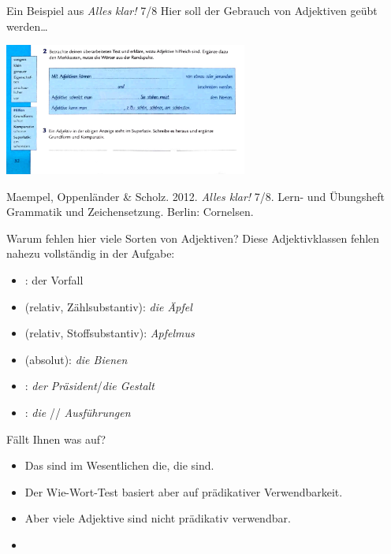 \begin{frame}
  {Ein Beispiel aus \textit{Alles klar!} 7\slash 8}
  Hier soll der Gebrauch von \alert{Adjektiven} geübt werden\ldots
  \begin{center}
    \includegraphics[width=0.6\textwidth]{graphics/adjektive2}
  \end{center}
  \tiny Maempel, Oppenländer \& Scholz. 2012. \textit{Alles klar!} 7\slash 8. Lern- und Übungsheft Grammatik und Zeichensetzung. Berlin: Cornelsen.
\end{frame}


\begin{frame}
  {Warum fehlen hier viele Sorten von Adjektiven?}
  \pause
  Diese Adjektivklassen fehlen nahezu vollständig in der Aufgabe:
  \pause
  \begin{itemize}[<+->]
    \item {}: der  Vorfall
    \item {} (relativ, Zählsubstantiv): \textit{die  Äpfel}
    \item {} (relativ, Stoffsubstantiv): \textit{ Apfelmus}
    \item {} (absolut): \textit{die  Bienen}
    \item {}: \textit{der  Präsident}\slash\textit{die  Gestalt}
    \item {}: \textit{die }/\textit{}/\textit{ Ausführungen}
  \end{itemize}
  \pause
  \Halbzeile
  Fällt Ihnen was auf?
  \pause
  \begin{itemize}[<+->]
    \item Das sind im Wesentlichen die, die  sind.
    \item Der Wie-Wort-Test basiert aber auf prädikativer Verwendbarkeit.
    \item Aber viele Adjektive sind nicht prädikativ verwendbar.
      \Halbzeile
    \item[ ] 
  \end{itemize}
\end{frame}


